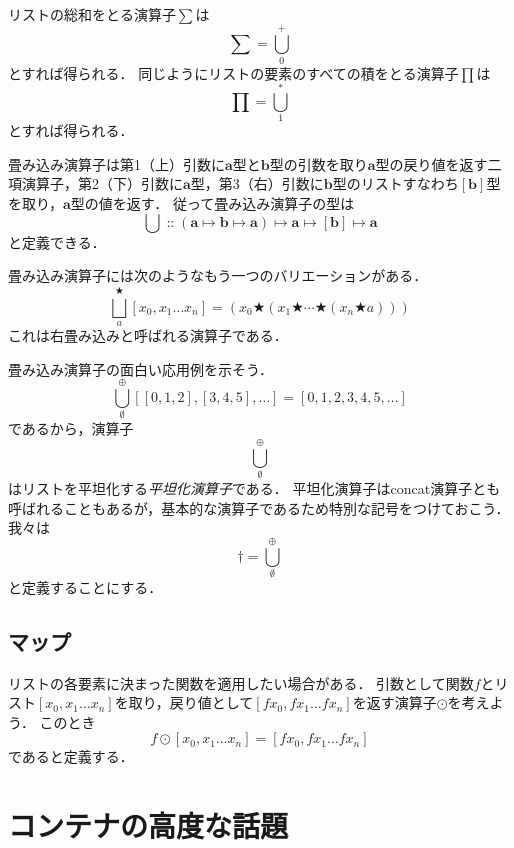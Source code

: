 \documentclass[twocolumn]{jsbook}
\newcommand{\keyword}[1]{\emph{#1}}
\newcommand{\typename}[1]{\mathbf{#1}}
\newcommand{\mmorph}[3]{#1\mapsto#2\mapsto#3}
\newcommand{\mmmorph}[4]{#1\mapsto#2\mapsto#3\mapsto#4}
\newcommand{\constantempty}{\emptyset}
\newcommand{\binarymultiply}{*}
\newcommand{\binarylistfunctormap}{\odot}
\newcommand{\binarylistappend}{\oplus}
\newcommand{\listtype}[1]{\left[#1\right]}
\newcommand{\rangedots}{\dots}
\newcommand{\infinitydots}{\dots}
\newcommand{\istypeof}{\mathop{::}}
\newcommand{\mathbinaryop}{\bigstar}
\newcommand{\mathfold}{\bigcup}
\newcommand{\mathfoldright}{\bigsqcup}
\begin{document}
リストの総和をとる演算子$\sum$は$$\sum=\mathfold^+_0$$とすれば得られる．
同じようにリストの要素のすべての積をとる演算子$\prod$は$$\prod=\mathfold^\binarymultiply_1$$とすれば得られる．

畳み込み演算子は第1（上）引数に$\typename{a}$型と$\typename{b}$型の引数を取り$\typename{a}$型の戻り値を返す二項演算子，第2（下）引数に$\typename{a}$型，第3（右）引数に$\typename{b}$型のリストすなわち$\listtype{\typename{b}}$型を取り，$\typename{a}$型の値を返す．
従って畳み込み演算子の型は$$\mathfold\istypeof\mmmorph{(\mmorph{\typename{a}}{\typename{b}}{\typename{a}})}{\typename{a}}{\listtype{\typename{b}}}{\typename{a}}$$と定義できる．

畳み込み演算子には次のようなもう一つのバリエーションがある．
$$\mathfoldright^\mathbinaryop_a\listtype{x_0,x_1\rangedots x_n}=\left(x_0\mathbinaryop\left(x_1\mathbinaryop\dotsb\mathbinaryop\left(x_n\mathbinaryop a\right)\right)\right)$$
これは右畳み込みと呼ばれる演算子である．


畳み込み演算子の面白い応用例を示そう．
$$\mathfold_\constantempty^\binarylistappend\listtype{\listtype{0,1,2},\listtype{3,4,5},\infinitydots}=\listtype{0,1,2,3,4,5,\infinitydots}$$
であるから，演算子$$\mathfold_\constantempty^\binarylistappend$$はリストを平坦化する\keyword{平坦化演算子}である．
平坦化演算子はconcat演算子とも呼ばれることもあるが，基本的な演算子であるため特別な記号をつけておこう．
我々は$$\dagger=\mathfold_\constantempty^\binarylistappend$$と定義することにする．

\section{マップ}

リストの各要素に決まった関数を適用したい場合がある．
引数として関数$f$とリスト$\listtype{x_0,x_1\rangedots x_n}$を取り，戻り値として$\listtype{fx_0,fx_1\rangedots fx_n}$を返す演算子$\binarylistfunctormap$を考えよう．
このとき$$f\binarylistfunctormap\listtype{x_0,x_1\rangedots x_n}=\listtype{fx_0,fx_1\rangedots fx_n}$$であると定義する．



\chapter{コンテナの高度な話題}
\end{document}
